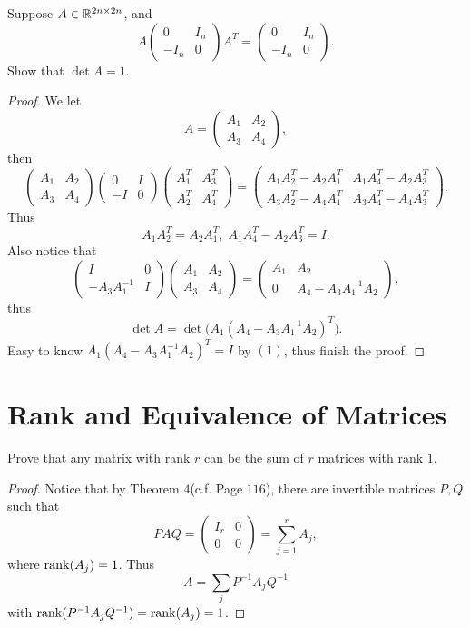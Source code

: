 \begin{pro}%
	Suppose $A\in\mathbb{R}^{2n\times 2n}$, and
	\[A\begin{pmatrix}0 & I_n\\-I_n & 0\end{pmatrix}A^T=
	\begin{pmatrix}0 & I_n\\-I_n & 0\end{pmatrix}.\]
	Show that $\det A=1$.
\end{pro}
\begin{proof}
	We let
	\[A=\begin{pmatrix}A_1 & A_2\\ A_3 & A_4\end{pmatrix},\]
	then
	\[\begin{pmatrix}A_1 & A_2\\ A_3 & A_4\end{pmatrix}
	\begin{pmatrix}0 & I\\ -I & 0\end{pmatrix}
	\begin{pmatrix}A_1^T & A_3^T\\ A_2^T & A_4^T\end{pmatrix}
	=\begin{pmatrix}A_1A_2^T-A_2A_1^T & A_1A_4^T-A_2 A_3^T\\
	A_3A_2^T-A_4A_1^T & A_3A_4^T-A_4A_3^T\end{pmatrix}.\]
	Thus
	\[A_1A_2^T=A_2A_1^T,\;A_1A_4^T-A_2A_3^T=I.\tag{1}\]
	Also notice that
	\[\begin{pmatrix}I & 0\\-A_3 A_1^{-1} & I\end{pmatrix}
	\begin{pmatrix}A_1 & A_2\\ A_3 & A_4\end{pmatrix}=
	\begin{pmatrix}A_1 & A_2\\ 0 & A_4-A_3A_1^{-1}A_2\end{pmatrix},\]
	thus
	\[\det A=\det\big(A_1(A_4-A_3A_1^{-1}A_2)^T\big).\]
	Easy to know $A_1(A_4-A_3A_1^{-1}A_2)^T=I$ by $(1)$,
	thus finish the proof.
\end{proof}

\section{Rank and Equivalence of Matrices}
\begin{pro}%
	Prove that any matrix with rank $r$ can be the sum of $r$ matrices with rank $1$.
\end{pro}
\begin{proof}
	Notice that by Theorem $4$(c.f. Page $116$), there are invertible matrices $P,Q$ such that
	\[PAQ=\begin{pmatrix} I_r & 0\\ 0 & 0\end{pmatrix}=\sum_{j=1}^r A_j,\]
	where $\operatorname*{rank}(A_j)=1$. Thus
	\[A=\sum_j P^{-1} A_j Q^{-1}\]
	with $\operatorname*{rank}(P^{-1} A_j Q^{-1})=\operatorname*{rank}(A_j)=1$.
\end{proof}

